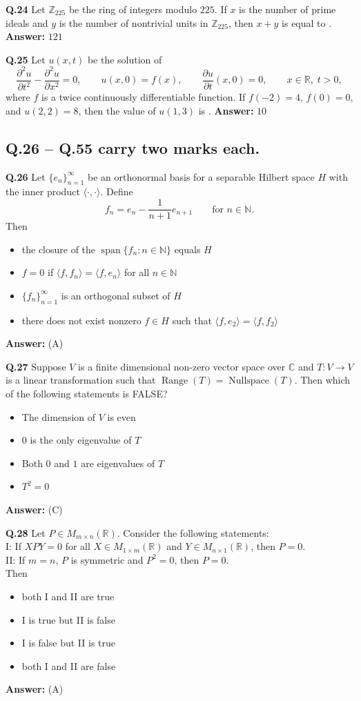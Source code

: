 \documentclass[11pt,a4paper]{article}
\newcommand{\optslistA}[4]{%
  \begin{itemize}
    \setlength{\itemsep}{2pt}\setlength{\parskip}{0pt}
    \item[(A)] #1
    \item[(B)] #2
    \item[(C)] #3
    \item[(D)] #4
  \end{itemize}%
}
\newcommand{\ans}[1]{\textbf{Answer:} #1\par\medskip}
\begin{document}
\textbf{Q.24} Let $\mathbb{Z}_{225}$ be the ring of integers modulo $225$. If $x$ is the number of prime ideals and $y$ is the number of nontrivial units in $\mathbb{Z}_{225}$, then $x + y$ is equal to \underline{\hspace{2cm}}.
\ans{$121$}

\textbf{Q.25} Let $u(x, t)$ be the solution of
\[
  \frac{\partial^2 u}{\partial t^2} - \frac{\partial^2 u}{\partial x^2} = 0, \qquad u(x, 0) = f(x), \qquad \frac{\partial u}{\partial t}(x, 0) = 0, \qquad x \in \mathbb{R},\; t > 0,
\]
where $f$ is a twice continuously differentiable function. If $f(-2) = 4$, $f(0) = 0$, and $u(2, 2) = 8$, then the value of $u(1, 3)$ is \underline{\hspace{2cm}}.
\ans{$10$}

\subsection*{Q.26 -- Q.55 carry two marks each.}

\textbf{Q.26} Let $\{e_n\}_{n=1}^{\infty}$ be an orthonormal basis for a separable Hilbert space $H$ with the inner product $\langle \cdot, \cdot \rangle$. Define
\[
  f_n = e_n - \frac{1}{n + 1} e_{n+1} \qquad \text{for } n \in \mathbb{N}.
\]
Then
\optslistA{the closure of the $\operatorname{span}\{f_n : n \in \mathbb{N}\}$ equals $H$}{$f = 0$ if $\langle f, f_n \rangle = \langle f, e_n \rangle$ for all $n \in \mathbb{N}$}{$\{f_n\}_{n=1}^{\infty}$ is an orthogonal subset of $H$}{there does not exist nonzero $f \in H$ such that $\langle f, e_2 \rangle = \langle f, f_2 \rangle$}
\ans{(A)}

\textbf{Q.27} Suppose $V$ is a finite dimensional non-zero vector space over $\mathbb{C}$ and $T : V \to V$ is a linear transformation such that $\operatorname{Range}(T) = \operatorname{Nullspace}(T)$. Then which of the following statements is FALSE?
\optslistA{The dimension of $V$ is even}{$0$ is the only eigenvalue of $T$}{Both $0$ and $1$ are eigenvalues of $T$}{$T^2 = 0$}
\ans{(C)}

\textbf{Q.28} Let $P \in M_{m \times n}(\mathbb{R})$. Consider the following statements:\\
I: If $XPY = 0$ for all $X \in M_{1 \times m}(\mathbb{R})$ and $Y \in M_{n \times 1}(\mathbb{R})$, then $P = 0$.\\
II: If $m = n$, $P$ is symmetric and $P^2 = 0$, then $P = 0$.\\
Then
\optslistA{both I and II are true}{I is true but II is false}{I is false but II is true}{both I and II are false}
\ans{(A)}
\end{document}
